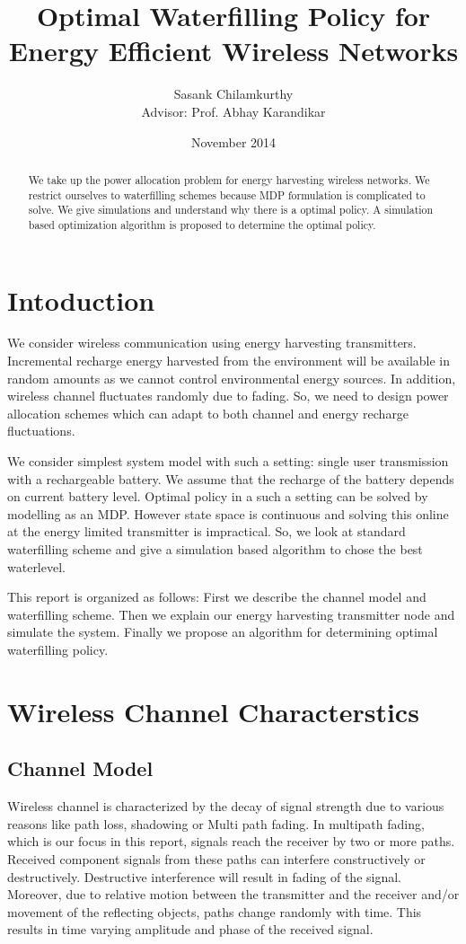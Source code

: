 \documentclass[a4paper,11pt]{article}
\begin{document}
\title{Optimal Waterfilling Policy for Energy Efficient Wireless Networks}
\author{Sasank Chilamkurthy\\ Advisor: Prof. Abhay Karandikar}
\date{November 2014}
\maketitle

\begin{abstract}
We take up the power allocation problem for energy harvesting wireless networks. We restrict ourselves to waterfilling schemes because MDP formulation is complicated to solve. We give simulations and understand why there is a optimal policy. A simulation based optimization algorithm is proposed to determine the optimal policy.
\end{abstract}

\section{Intoduction}
We consider wireless communication using energy harvesting transmitters. Incremental recharge 
energy harvested from the environment will be available in random amounts as we cannot control environmental energy sources. In addition, wireless channel fluctuates randomly due to fading.
So, we need to design power allocation schemes which can adapt to both channel and energy recharge fluctuations.

We consider simplest system model with such a setting: single user transmission with a rechargeable battery. 
We assume that the recharge of the battery depends on current battery level. 
Optimal policy in a such a setting can be solved by modelling as an MDP. 
However state space is continuous and solving this online at the energy limited transmitter 
is impractical. So, we look at standard waterfilling scheme and give a simulation based  algorithm to chose the best waterlevel.

This report is organized as follows: First we describe the channel model and waterfilling scheme. 
Then we explain our energy harvesting transmitter node and simulate the system. Finally we propose an algorithm for determining optimal waterfilling policy.

\section{Wireless Channel Characterstics}
\subsection{Channel Model}
Wireless channel is characterized by the decay of signal strength due to various reasons like path loss, shadowing or Multi path fading. 
In multipath fading, which is our focus in this report, signals reach the receiver by two or more paths. 
Received component signals from these paths can interfere constructively or destructively. Destructive interference will result in fading of the signal. 
Moreover, due to relative motion between the transmitter and the receiver and/or movement of the reflecting objects, paths change randomly with time. 
This results in time varying amplitude and phase of the received signal.
\end{document}
